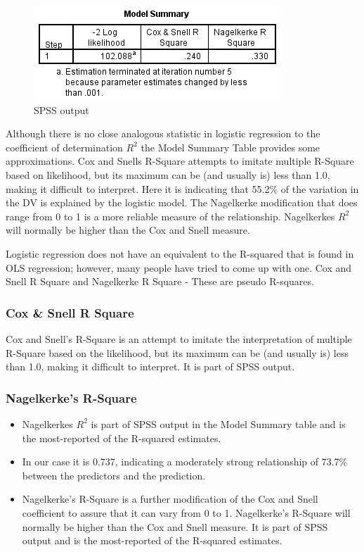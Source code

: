 \documentclass[a4paper,12pt]{article}
\begin{document}
\begin{figure}[h!]
	\centering
	\includegraphics[width=0.9\linewidth]{images/BLogReg-Rsq}
	\caption{SPSS output}
	\label{fig:BLogReg-Rsq}
\end{figure}
Although there is no close analogous statistic in logistic regression to
the coefficient of determination $R^2$ the Model Summary Table provides some approximations. Cox and Snells R-Square attempts to imitate multiple R-Square based on likelihood, but its maximum can be (and usually is) less than 1.0, making it difficult to interpret. Here it is indicating that 55.2\% of the variation in the DV is explained by the
logistic model. The Nagelkerke modification that does range from 0 to 1 is a more reliable
measure of the relationship. Nagelkerkes $R^2$ will normally be higher than the Cox and Snell measure.





\newpage
Logistic regression does not have an equivalent to the R-squared that is found in OLS regression; however, many people have tried to come up with one.  
Cox  and Snell R Square and Nagelkerke R Square - These are pseudo R-squares.  

\subsubsection{Cox \& Snell R Square}
Cox and Snell's R-Square is an attempt to imitate the interpretation of multiple R-Square based on the likelihood, but its maximum can be (and usually is) less than 1.0, making it difficult to interpret. It is part of SPSS output.

\subsubsection{Nagelkerke's R-Square}
\begin{itemize}
	\item  Nagelkerkes $R^2$ is part of SPSS output in the Model Summary table and is the most-reported of the R-squared estimates. 
	\item In our case it is 0.737, indicating a moderately strong relationship of 73.7\% between the predictors and the prediction.
	
	
\item 	Nagelkerke's R-Square is a further modification of the Cox and Snell coefficient to assure that it can vary from 0 to 1. Nagelkerke's R-Square will normally be higher than the Cox and Snell measure. It is part of SPSS output and is the most-reported of the R-squared estimates.
\end{itemize}
\end{document}
